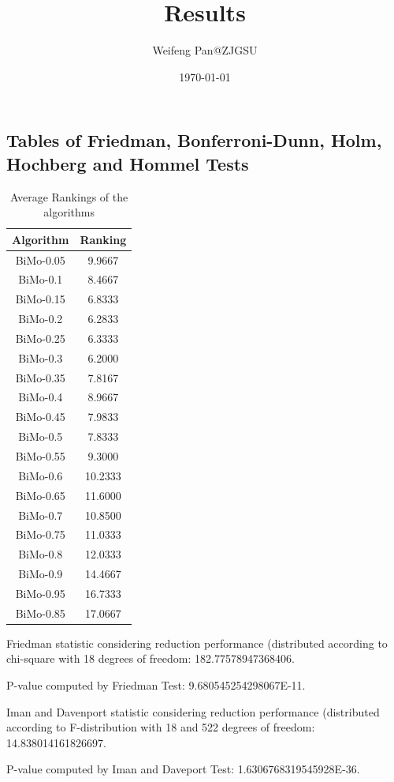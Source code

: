 \documentclass[a4paper,10pt]{article}
\title{Results}
\author{Weifeng Pan@ZJGSU}
\date{\today}
\begin{document}
\begin{landscape}
\oddsidemargin 0in \topmargin 0in\maketitle
\section{Tables of Friedman, Bonferroni-Dunn, Holm, Hochberg and Hommel Tests}
\begin{table}[!htp]
\centering
\caption{Average Rankings of the algorithms
}\begin{tabular}{c|c}
Algorithm&Ranking\\
\hline
BiMo-0.05&9.9667\\
BiMo-0.1&8.4667\\
BiMo-0.15&6.8333\\
BiMo-0.2&6.2833\\
BiMo-0.25&6.3333\\
BiMo-0.3&6.2000\\
BiMo-0.35&7.8167\\
BiMo-0.4&8.9667\\
BiMo-0.45&7.9833\\
BiMo-0.5&7.8333\\
BiMo-0.55&9.3000\\
BiMo-0.6&10.2333\\
BiMo-0.65&11.6000\\
BiMo-0.7&10.8500\\
BiMo-0.75&11.0333\\
BiMo-0.8&12.0333\\
BiMo-0.9&14.4667\\
BiMo-0.95&16.7333\\
BiMo-0.85&17.0667\\
\end{tabular}
\end{table}


Friedman statistic considering reduction performance (distributed according to chi-square with 18 degrees of freedom: 182.77578947368406.


P-value computed by Friedman Test: 9.680545254298067E-11.\newline

Iman and Davenport statistic considering reduction performance (distributed according to F-distribution with 18 and 522 degrees of freedom: 14.838014161826697.


P-value computed by Iman and Daveport Test: 1.6306768319545928E-36.\newline


\end{landscape}
\end{document}
